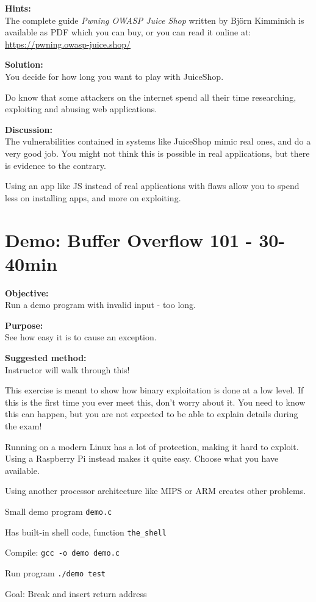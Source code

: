 \documentclass[a4paper,11pt,notitlepage]{report}
\begin{document}
 {\bf Hints:}\\
 The complete guide \emph{Pwning OWASP Juice Shop}
written by Björn Kimminich is available as PDF which you can buy, or you can read it online at:\\
\url{https://pwning.owasp-juice.shop/}


 {\bf Solution:}\\
 You decide for how long you want to play with JuiceShop.

 Do know that some attackers on the internet spend all their time researching, exploiting and abusing web applications.

 {\bf Discussion:}\\
The vulnerabilities contained in systems like JuiceShop mimic real ones, and do a very good job. You might not think this is possible in real applications, but there is evidence to the contrary.

Using an app like JS instead of real applications with flaws allow you to spend less on installing apps, and more on exploiting.





\chapter{Demo: Buffer Overflow 101 - 30-40min}
\label{ex:bufferoverflow}


{\bf Objective:}\\
Run a demo program with invalid input - too long.

{\bf Purpose:}\\
See how easy it is to cause an exception.

{\bf Suggested method:}\\
Instructor will walk through this!

{\Large This exercise is meant to show how binary exploitation is done at a low level. If this is the first time you ever meet this, don't worry about it. You need to know this can happen, but you are not expected to be able to explain details during the exam!}

Running on a modern Linux has a lot of protection, making it hard to exploit. Using a Raspberry Pi instead makes it quite easy. Choose what you have available.

Using another processor architecture like MIPS or ARM creates other problems.

\begin{list2}
\item Small demo program \verb+demo.c+
\item Has built-in shell code, function \verb+the_shell+
\item Compile:
\verb+gcc -o demo demo.c+
\item Run program
\verb+./demo test+
\item Goal: Break and insert return address
\end{list2}
\end{document}

